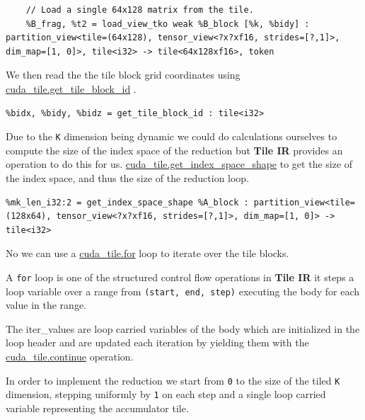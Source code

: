\documentclass{article}
\begin{document}
\begin{lstlisting}
    // Load a single 64x128 matrix from the tile.
    %B_frag, %t2 = load_view_tko weak %B_block [%k, %bidy] : partition_view<tile=(64x128), tensor_view<?x?xf16, strides=[?,1]>, dim_map=[1, 0]>, tile<i32> -> tile<64x128xf16>, token
\end{lstlisting}

We then read the the tile block grid coordinates using \href{https://docs.nvidia.com/cuda/tile-ir/latest/sections/operations.html#op-cuda-tile-get-tile-block-id}{cuda\_tile.get\_tile\_block\_id} .


\begin{lstlisting}
%bidx, %bidy, %bidz = get_tile_block_id : tile<i32>
\end{lstlisting}

Due to the \texttt{K} dimension being dynamic we could do calculations ourselves to compute the size of the index space of the reduction but \textbf{Tile IR} provides an operation to do this for us. \href{https://docs.nvidia.com/cuda/tile-ir/latest/sections/operations.html#op-cuda-tile-get-index-space-shape}{cuda\_tile.get\_index\_space\_shape} to get the size of the index space, and thus the size of the reduction loop.


\begin{lstlisting}
%mk_len_i32:2 = get_index_space_shape %A_block : partition_view<tile=(128x64), tensor_view<?x?xf16, strides=[?,1]>, dim_map=[1, 0]> -> tile<i32>
\end{lstlisting}

No we can use a \href{https://docs.nvidia.com/cuda/tile-ir/latest/sections/operations.html#op-cuda-tile-for}{cuda\_tile.for} loop to iterate over the tile blocks.


A \texttt{for} loop is one of the structured control flow operations in \textbf{Tile IR} it steps a loop variable over a range from \texttt{(start, end, step)} executing the body for each value in the range.

The iter\_values are loop carried variables of the body which are initialized in the loop header and are updated each iteration by yielding them with the \href{https://docs.nvidia.com/cuda/tile-ir/latest/sections/operations.html#op-cuda-tile-continue}{cuda\_tile.continue} operation.


In order to implement the reduction we start from \texttt{0} to the size of the tiled \texttt{K} dimension, stepping uniformly by \texttt{1} on each step and a single loop carried variable representing the accumulator tile.
\end{document}
